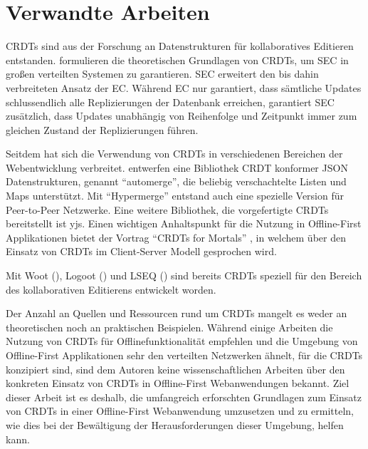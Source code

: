 \documentclass[a4paper, 12pt]{scrreprt}
\newcommand\klammercite[1]{%
	(\citealt{#1})}
\begin{document}
\section{Verwandte Arbeiten}
\label{sec:VerwandteArbeiten}

\acp{CRDT} sind aus der Forschung an Datenstrukturen für kollaboratives Editieren entstanden. \citet{InproceedingsCRDTOriginal} formulieren die theoretischen Grundlagen von \acp{CRDT}, um \ac{SEC} in großen verteilten Systemen zu garantieren. \ac{SEC} erweitert den bis dahin verbreiteten Ansatz der \ac{EC}. Während EC nur garantiert, dass sämtliche Updates schlussendlich alle Replizierungen der Datenbank erreichen, garantiert SEC zusätzlich, dass Updates unabhängig von Reihenfolge und Zeitpunkt immer zum gleichen Zustand der Replizierungen führen.

Seitdem hat sich die Verwendung von \acp{CRDT} in verschiedenen Bereichen der Webentwicklung verbreitet. \citet{ArticleCRDTJSON} entwerfen eine Bibliothek CRDT konformer \ac{JSON} Datenstrukturen, genannt \enquote{automerge}, die beliebig verschachtelte Listen und Maps unterstützt. Mit \enquote{Hypermerge} entstand auch eine spezielle Version für Peer-to-Peer Netzwerke. Eine weitere Bibliothek, die vorgefertigte \acp{CRDT} bereitstellt ist yjs\autocite{inproceedingsYjs}. Einen wichtigen Anhaltspunkt für die Nutzung in Offline-First Applikationen bietet der Vortrag \enquote{\acp{CRDT} for Mortals} \autocite{OnlineCrdtsForMortals}, in welchem über den Einsatz von \acp{CRDT} im Client-Server Modell gesprochen wird.  

Mit Woot \klammercite{InproceedingsCRDTWoot}, Logoot \klammercite{InproceedingsCRDTLogoot} und LSEQ \klammercite{InproceedingsCRDTLSEQ} sind bereits \acp{CRDT} speziell für den Bereich des kollaborativen Editierens entwickelt worden. 

Der Anzahl an Quellen und Ressourcen rund um \acp{CRDT} mangelt es weder an theoretischen noch an praktischen Beispielen. Während einige Arbeiten die Nutzung von \acp{CRDT} für Offlinefunktionalität empfehlen und die Umgebung von Offline-First Applikationen sehr den verteilten Netzwerken ähnelt, für die \acp{CRDT} konzipiert sind, sind dem Autoren keine wissenschaftlichen Arbeiten über den konkreten Einsatz von \acp{CRDT} in Offline-First Webanwendungen bekannt. Ziel dieser Arbeit ist es deshalb, die umfangreich erforschten Grundlagen zum Einsatz von \acp{CRDT} in einer Offline-First Webanwendung umzusetzen und zu ermitteln, wie dies bei der Bewältigung der Herausforderungen dieser Umgebung, helfen kann.
\end{document}

